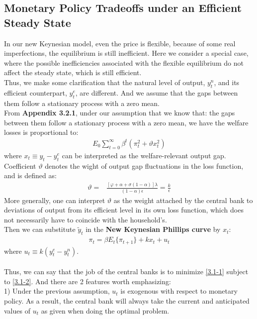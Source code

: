 \documentclass{article}
\numberwithin{equation}{section}
\begin{document}
\subsection{Monetary Policy Tradeoffs under an Efficient Steady State}
In our new Keynesian model, even the price is flexible, because of some real imperfections, the equilibrium is still inefficient. Here we consider a special case, where the possible inefficiencies associated with the flexible equilibrium do not affect the steady state, which is still efficient.\\
Thus, we make some clarification that the natural level of output, $y^n_t$, and its efficient counterpart, $y^e_t$, are different. And we assume that the gaps between them follow a stationary process with a zero mean.\\
From \textbf{Appendix 3.2.1}, under our assumption that we know that: the gaps between them follow a stationary process with a zero mean, we have the welfare losses is proportional to:
	\begin{align}
		E_0 \sum\limits^\infty_{t=0} \beta^t (\pi^2_t + \vartheta x^2_t) \label{3.1-1}
	\end{align}
where $x_t \equiv y_t - y^e_t$ can be interpreted as the welfare-relevant output gap.\\
Coefficient $\vartheta$ denotes the wight of output gap fluctuations in the loss function, and is defined as:
	\begin{align*}
		\vartheta =& \frac{\left[ \varphi + \alpha + \sigma(1 - \alpha) \right]\lambda}{(1 - \alpha)\epsilon} = \frac{k}{\epsilon} 
	\end{align*}
More generally, one can interpret $\vartheta$ as the weight attached by the central bank to deviations of output from its efficient level in its own loss function, which does not necessarily have to coincide with the household's.\\
Then we can substitute $\tilde{y}_t$ in the \textbf{New Keynesian Phillips curve} by $x_t$:
	\begin{align}
		\pi_t = \beta E_t\{ \pi_{t+1} \} + kx_t + u_t \label{3.1-2}
	\end{align}
where $u_t \equiv k(y^e_t - y^n_t)$.\\\\
Thus, we can say that the job of the central banks is to minimize \eqref{3.1-1} subject to \eqref{3.1-2}. And there are 2 features worth emphasizing:\\
1) Under the previous assumption, $u_t$ is exogenous with respect to monetary policy. As a result, the central bank will always take the current and anticipated values of $u_t$ as given when doing the optimal problem.\\
\end{document}
